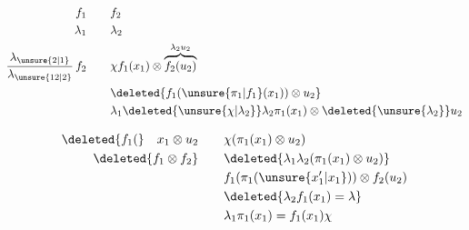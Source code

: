 
\[
\begin{aligned}
 f_1&\qquad f_2\\ \lambda_1&\qquad\lambda_2\\
 \frac{\lambda_{\unsure{2|1}}}{\lambda_{\unsure{12|2}}}\,f_2&\qquad
 \chi f_1(x_1)\otimes\overbrace{f_2(u_2)}^{\lambda_2u_2}\\
 &\qquad\deleted{f_1(\unsure{\pi_1|f_1}(x_1))\otimes u_2}\\
 &\qquad \lambda_1\deleted{\unsure{\chi|\lambda_2}}\lambda_2\pi_1(x_1)\otimes\deleted{\unsure{\lambda_2}}u_2
\end{aligned}
\]

\[
\begin{aligned}
 \deleted{f_1(}\quad x_1\otimes u_2&\qquad\chi(\pi_1(x_1)\otimes u_2)\\
 \deleted{f_1\otimes f_2}&\qquad \deleted{\lambda_1\lambda_2(\pi_1(x_1)\otimes u_2)}\\
 &\qquad f_1(\pi_1(\unsure{x'_1|x_1}))\otimes f_2(u_2)\\
 &\qquad\deleted{\lambda_2 f_1(x_1)=\lambda}\\
 &\qquad \lambda_1\pi_1(x_1)=f_1(x_1)\chi
\end{aligned}
\]

